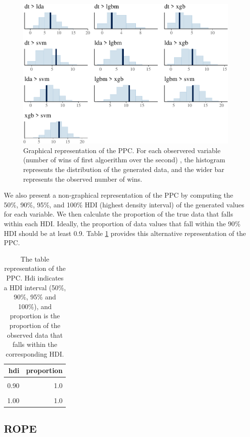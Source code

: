 \documentclass[twoside,11pt,preprint]{article}
\begin{document}
\begin{figure}
\includegraphics[width=0.7\linewidth]{figure-latex/xppc1-1} \caption{\label{fig:ppc1}Graphical representation of the PPC. For each observered variable (number of wins of first algoerithm over the second) , the histogram represents the distribution of the generated data, and the wider bar represents the observed number of wins.}\label{fig:xppc1}
\end{figure}

We also present a non-graphical representation of the PPC by computing the 50\%, 90\%, 95\%, and 100\% HDI (highest density interval) of the generated values for each variable. We then calculate the proportion of the true data that falls within each HDI. Ideally, the proportion of data values that fall within the 90\% HDI should be at least 0.9. Table \ref{tab:ppc1} provides this alternative representation of the PPC.

\begin{table}

\caption{\label{tab:xppc2}\label{tab:ppc1}The table representation of the PPC. Hdi indicates a HDI interval (50\%, 90\%, 95\% and 100\%), and proportion is the proportion of the observed data that falls within the corresponding HDI. }
\centering
\begin{tabular}[t]{rr}
\toprule
\textbf{hdi} & \textbf{proportion}\\
\midrule
\cellcolor{gray!6}{0.50} & \cellcolor{gray!6}{0.8}\\
0.90 & 1.0\\
\cellcolor{gray!6}{0.95} & \cellcolor{gray!6}{1.0}\\
1.00 & 1.0\\
\bottomrule
\end{tabular}
\end{table}

\hypertarget{rope-1}{%
\subsection{\texorpdfstring{ROPE \label{sec:rope2}}{ROPE }}\label{rope-1}}
\end{document}
